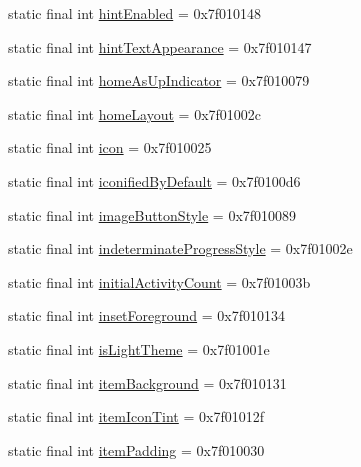 \begin{CompactItemize}
\item 
static final int \hyperlink{classandroid_1_1support_1_1transition_1_1_r_1_1attr_4807be9470373162b3362616bd13dd1b}{hintEnabled} = 0x7f010148
\item 
static final int \hyperlink{classandroid_1_1support_1_1transition_1_1_r_1_1attr_cebf97defcf74a193b4e4dfb6aa6bc21}{hintTextAppearance} = 0x7f010147
\item 
static final int \hyperlink{classandroid_1_1support_1_1transition_1_1_r_1_1attr_e05e5e3faece6a8edf933e4130bc88e3}{homeAsUpIndicator} = 0x7f010079
\item 
static final int \hyperlink{classandroid_1_1support_1_1transition_1_1_r_1_1attr_40330f9f46c161a7c7efbabeb64b4625}{homeLayout} = 0x7f01002c
\item 
static final int \hyperlink{classandroid_1_1support_1_1transition_1_1_r_1_1attr_a328c1613f8f0fb7d0c1f8af33340943}{icon} = 0x7f010025
\item 
static final int \hyperlink{classandroid_1_1support_1_1transition_1_1_r_1_1attr_827ffb6a08d342c0522e00fef2a96981}{iconifiedByDefault} = 0x7f0100d6
\item 
static final int \hyperlink{classandroid_1_1support_1_1transition_1_1_r_1_1attr_021a3ecb4d40097283ec71196e70169f}{imageButtonStyle} = 0x7f010089
\item 
static final int \hyperlink{classandroid_1_1support_1_1transition_1_1_r_1_1attr_ca22f097aebd578da46789b2e5ddb24c}{indeterminateProgressStyle} = 0x7f01002e
\item 
static final int \hyperlink{classandroid_1_1support_1_1transition_1_1_r_1_1attr_a990c5e76b04d8d94b586df64902b36a}{initialActivityCount} = 0x7f01003b
\item 
static final int \hyperlink{classandroid_1_1support_1_1transition_1_1_r_1_1attr_d388c6c0c1f51b02f0308a0bafe4e93e}{insetForeground} = 0x7f010134
\item 
static final int \hyperlink{classandroid_1_1support_1_1transition_1_1_r_1_1attr_9d340fd5a35d4f7fbcd9a6c7e7fbbbaa}{isLightTheme} = 0x7f01001e
\item 
static final int \hyperlink{classandroid_1_1support_1_1transition_1_1_r_1_1attr_07324e572ffe105491625212130688bd}{itemBackground} = 0x7f010131
\item 
static final int \hyperlink{classandroid_1_1support_1_1transition_1_1_r_1_1attr_6f950c9eba4999bcaf2e029802fa8a05}{itemIconTint} = 0x7f01012f
\item 
static final int \hyperlink{classandroid_1_1support_1_1transition_1_1_r_1_1attr_39ab27b184c35304040d733636d51763}{itemPadding} = 0x7f010030

\end{CompactItemize}
